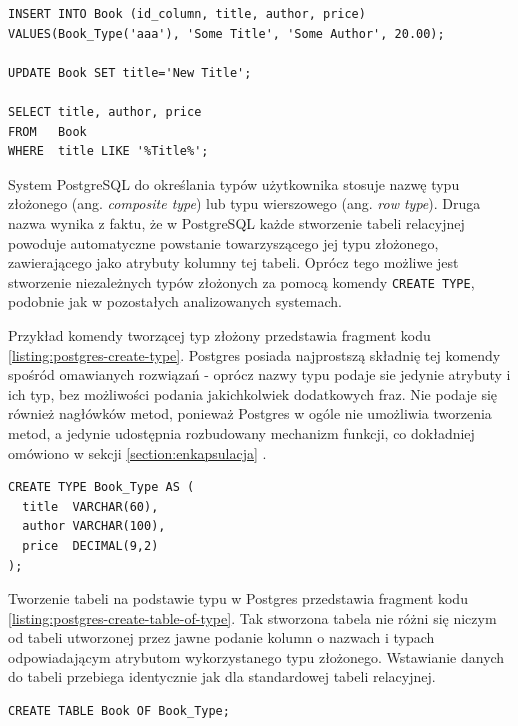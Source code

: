 \documentclass[a4paper,twoside,12pt]{book}
\begin{document}
\begin{lstlisting}[style=SQL, caption={Korzystanie z typowanej tabeli w IBM Db2.}, label={listing:db2-typed-table-queries}, captionpos=b]
INSERT INTO Book (id_column, title, author, price)
VALUES(Book_Type('aaa'), 'Some Title', 'Some Author', 20.00);
      
UPDATE Book SET title='New Title';

SELECT title, author, price
FROM   Book
WHERE  title LIKE '%Title%';
\end{lstlisting}



System PostgreSQL do określania typów użytkownika stosuje nazwę typu złożonego (ang. \textit{composite type}) lub typu wierszowego (ang. \textit{row type}). Druga nazwa wynika z faktu, że w PostgreSQL każde stworzenie tabeli relacyjnej powoduje automatyczne powstanie towarzyszącego jej typu złożonego, zawierającego jako atrybuty kolumny tej tabeli. Oprócz tego możliwe jest stworzenie niezależnych typów złożonych za pomocą komendy \lstinline{CREATE TYPE}, podobnie jak w pozostałych analizowanych systemach. 

Przykład komendy tworzącej typ złożony przedstawia fragment kodu \ref{listing:postgres-create-type}. Postgres posiada najprostszą składnię tej komendy spośród omawianych rozwiązań - oprócz nazwy typu podaje sie jedynie atrybuty i ich typ, bez możliwości podania jakichkolwiek dodatkowych fraz. Nie podaje się również nagłówków metod, ponieważ Postgres w ogóle nie umożliwia tworzenia metod, a jedynie udostępnia rozbudowany mechanizm funkcji, co dokładniej omówiono w sekcji \ref{section:enkapsulacja} .

\begin{lstlisting}[style=SQL, caption={Tworzenie typu w PostgreSQL.}, label={listing:postgres-create-type}, captionpos=b]
CREATE TYPE Book_Type AS (
  title  VARCHAR(60),
  author VARCHAR(100),
  price  DECIMAL(9,2)
);
\end{lstlisting}

Tworzenie tabeli na podstawie typu w Postgres przedstawia fragment kodu \ref{listing:postgres-create-table-of-type}. Tak stworzona tabela nie różni się niczym od tabeli utworzonej przez jawne podanie kolumn o nazwach i typach odpowiadającym atrybutom wykorzystanego typu złożonego. Wstawianie danych do tabeli przebiega identycznie jak dla standardowej tabeli relacyjnej.

\begin{lstlisting}[style=SQL, caption={Tworzenie tabeli na podstawie typu w PostgreSQL.}, label={listing:postgres-create-table-of-type}, captionpos=b]
CREATE TABLE Book OF Book_Type;
\end{lstlisting}
\end{document}
